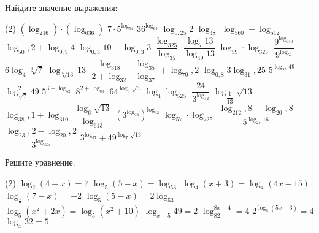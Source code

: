 %
%
%
%
\begin{class}[number=1]
	\begin{listofex}
		\item Найдите значение выражения:
		\begin{tasks}(2)
			\task \( (\log_216)\cdot(\log_636) \)
			\task \( 7\cdot5^{\log_54} \)
			\task \( 36^{\log_65} \)
			\task \( \log_{0,25}2 \)
			\task \( \log_48 \)
			\task \( \log_560-\log_512 \)
			\task \( \log_50,2+\log_{0,5}4 \)
			\task \( \log_{0,3}10-\log_{0,3}3 \)
			\task \( \dfrac{\log_325}{\log_35} \)
			\task \( \dfrac{\log_{7}13}{\log_{49}13} \)
			\task \( \log_59\cdot\log_325 \)
			\task \( \dfrac{9^{\log_550}}{9^{\log_52}} \)
			\task \( 6\log_4\sqrt[3]{7} \)
			\task \( \log_{\sqrt[6]{13}}13 \)
			\task \( \dfrac{\log_318}{2+\log_32} \)
			\task \( \dfrac{\log_35}{\log_37}+\log_70,2 \)
			\task \( \log_{0,8}3\log_31,25 \)
			\task \( 5^{\log_{25}49} \)
			\task \( \log^2_{\sqrt{7}}49 \)
			\task \( 5^{3+\log_52} \)
			\task \( 8^{2+\log_83} \)
			\task \( 64^{\log_8\sqrt{3}} \)
			\task \( \log_4\log_525 \)
			\task \( \dfrac{24}{3^{\log_32}} \)
			\task \( \log_{\dfrac{1}{13}}\sqrt{13} \)
			\task \( \log_38,1+\log_310 \)
			\task \( \dfrac{\log_6\sqrt{13}}{\log_613} \)
			\task \( \left( 3^{\log_23} \right)^{\log_32}\)
			\task \( \log_57\cdot\log_725 \)
			\task \( \dfrac{\log_212,8-\log_20,8}{5^{\log_{25}16}} \)
			\task \( \dfrac{\log_23,2-\log_20,2}{3^{\log_925}} \)
			\task \( 3^{\log_37}+49^{\log_7{\sqrt{13}}} \)
		\end{tasks}	
		\item \mexercise{_78}
		\item Решите уравнение:
		\begin{tasks}(2)
			\task \( \log_2(4-x)=7 \)
			\task \( \log_5(5-x)=\log_53 \)
			\task \( \log_4(x+3)=\log_4(4x-15) \)
			\task \( \log_{\frac{1}{7}}(7-x)=-2 \)
			\task \( \log_5(5-x)=2\log_53 \)
			\task \( \log_5(x^2+2x)=\log_5(x^2+10) \)
			\task \( \log_{x-5}49=2 \)
			\task \( \log_82^{8x-4}=4 \)
			\task \( 2^{\log_8(5x-3)}=4 \)
			\task \( \log_x32=5 \)
		\end{tasks}
	\end{listofex}
\end{class}
%
%
